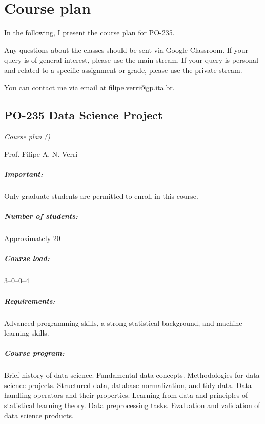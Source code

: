 \chapter*{Course plan}
\thispagestyle{empty}

In the following, I present the course plan for PO-235.

Any questions about the classes should be sent via Google Classroom.  If your query is of
general interest, please use the main stream.  If your query is personal and related to
a specific assignment or grade, please use the private stream.

You can contact me via email at
\href{mailto:filipe.verri@gp.ita.br}{filipe.verri@gp.ita.br}.

\newpage
\thispagestyle{empty}
\section*{PO-235 Data Science Project}

\emph{Course plan (\the\year{})}

Prof. Filipe A. N. Verri

\paragraph{Important:} Only graduate students are permitted to enroll in this course.

\paragraph{Number of students:} Approximately 20

\paragraph{Course load:} 3--0--0--4

\paragraph{Requirements:} Advanced programming skills, a strong statistical background, and
machine learning skills.

\paragraph{Course program:}
Brief history of data science.  Fundamental data concepts.  Methodologies for data science
projects.  Structured data, database normalization, and tidy data.  Data handling
operators and their properties.  Learning from data and principles of statistical learning
theory.  Data preprocessing tasks.  Evaluation and validation of data science products.


